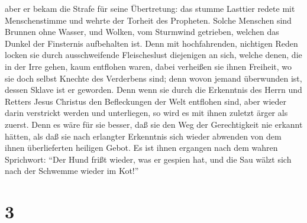  aber er bekam die Strafe für seine Übertretung: das
stumme Lasttier redete mit Menschenstimme und wehrte der Torheit des
Propheten.  Solche Menschen sind Brunnen ohne Wasser, und
Wolken, vom Sturmwind getrieben, welchen das Dunkel der Finsternis
aufbehalten ist.  Denn mit hochfahrenden, nichtigen Reden
locken sie durch ausschweifende Fleischeslust diejenigen an sich, welche
denen, die in der Irre gehen, kaum entflohen waren, 
dabei verheißen sie ihnen Freiheit, wo sie doch selbst Knechte des
Verderbens sind; denn wovon jemand überwunden ist, dessen Sklave ist er
geworden.  Denn wenn sie durch die Erkenntnis des Herrn
und Retters Jesus Christus den Befleckungen der Welt entflohen sind,
aber wieder darin verstrickt werden und unterliegen, so wird es mit
ihnen zuletzt ärger als zuerst.  Denn es wäre für sie
besser, daß sie den Weg der Gerechtigkeit nie erkannt hätten, als daß
sie nach erlangter Erkenntnis sich wieder abwenden von dem ihnen
überlieferten heiligen Gebot.  Es ist ihnen ergangen nach
dem wahren Sprichwort: ``Der Hund frißt wieder, was er gespien hat, und
die Sau wälzt sich nach der Schwemme wieder im Kot!''

\hypertarget{section-2}{%
\section{3}\label{section-2}}

